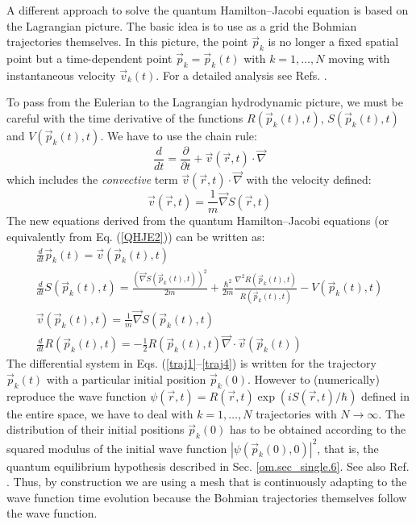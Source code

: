 \documentclass[nofootinbib, secnumarabic, amsmath, nobibnotes,10pt,aps,pra]{revtex4-1}
\newcommand{\sref}[1]{Sec. \ref{#1}}
\newcommand{\eref}[1]{Eq. (\ref{#1})}
\begin{document}
A different approach to solve the quantum Hamilton--Jacobi equation
is based on the Lagrangian picture. The basic idea is to use as a
grid the Bohmian trajectories themselves. In this picture, the point
$\vec{p}_k$ is no longer a fixed spatial point but a time-dependent
point $\vec{p}_k = \vec{p}_k(t)$ with $k = 1,\ldots,N$ moving with
instantaneous velocity $\vec{v}_k(t)$. For a detailed analysis see
Refs. \cite{om.Wyatt1, om.Wyatt2, om.Wyatt3, om.Frederick}.

To pass from the Eulerian to the Lagrangian hydrodynamic picture, we
must  be careful with the time derivative of the functions
$R(\vec{p}_{k}(t),t)$, $S(\vec{p}_{k}(t),t)$ and
$V(\vec{p}_{k}(t),t)$. We have to use the chain rule:
\begin{equation}
\frac{d}{dt} = \frac{\partial}{\partial t} + \vec v(\vec r,t)\cdot\vec{\nabla}
\end{equation}
which includes the \textit{convective} term \textit{$\vec{v}(\vec r,t)\cdot\vec{\nabla}$} with the velocity defined:
\begin{equation}
\vec{v}(\vec r,t) = \frac{1}{m}\vec{\nabla} S(\vec r,t)
\end{equation}
The new equations derived from the quantum Hamilton--Jacobi equations (or equivalently from \eref{QHJE2}) can be written as:
\begin{gather}
\frac{d}{dt}\vec{p}_k(t) = \vec{v}(\vec{p}_k(t),t)\label{traj1}\\[0.1in]
\frac{d}{dt}S(\vec{p}_k(t),t) = \frac{(\vec{\nabla} S(\vec{p}_k(t),t))^{2}}{2m} + \frac{\hbar^{2}%
}{2m}\frac{\nabla^{2}R(\vec{p}_k(t),t)}{R(\vec{p}_k(t),t)} - V(\vec{p}_k(t),t)\label{traj2}\\[0.1in]
\vec{v}(\vec{p}_k(t),t) = \frac{1}{m}\vec{\nabla} S(\vec{p}_k(t),t)\label{traj3}\\[0.1in]
\frac{d}{dt}R(\vec{p}_k(t),t) = -\frac{1}{2}R(\vec{p}_k(t),t)\vec{\nabla}\cdot\vec{v}(\vec
{p}_k(t))\label{traj4}%
\end{gather}
The differential system in Eqs. (\ref{traj1}--\ref{traj4}) is written for the trajectory $\vec{p}_k(t)$ with a particular initial position $\vec{p}_k(0)$. However to (numerically) reproduce the wave function $\psi(\vec r,t) = R(\vec r,t)\exp(iS(\vec r,t)/\hbar)$ defined in the entire space, we have to deal with $k = 1,\ldots,N$ trajectories with $N\rightarrow\infty$. The distribution of their initial positions $\vec{p}_k(0)$ has to be obtained according to the squared modulus of the initial wave function $|\psi(\vec p_k(0),0)|^2$, that is, the quantum equilibrium hypothesis described in \sref{om.sec_single.6}. See also Ref. \cite{om.Holand1993}. Thus, by construction we are using a mesh that is continuously adapting to the wave function time evolution because the Bohmian trajectories themselves follow the wave function.
\end{document}
